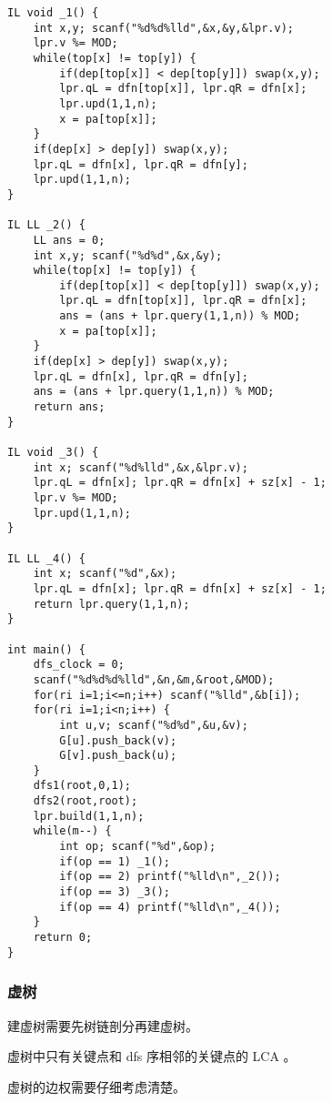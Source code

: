 \documentclass[UTF8]{ctexart}
\begin{document}
\begin{framed}
\begin{lstlisting}
IL void _1() {
    int x,y; scanf("%d%d%lld",&x,&y,&lpr.v);
    lpr.v %= MOD;
    while(top[x] != top[y]) {
        if(dep[top[x]] < dep[top[y]]) swap(x,y);
        lpr.qL = dfn[top[x]], lpr.qR = dfn[x];
        lpr.upd(1,1,n);
        x = pa[top[x]];
    }
    if(dep[x] > dep[y]) swap(x,y);
    lpr.qL = dfn[x], lpr.qR = dfn[y];
    lpr.upd(1,1,n);
}

IL LL _2() {
    LL ans = 0;
    int x,y; scanf("%d%d",&x,&y);
    while(top[x] != top[y]) {
        if(dep[top[x]] < dep[top[y]]) swap(x,y);
        lpr.qL = dfn[top[x]], lpr.qR = dfn[x];
        ans = (ans + lpr.query(1,1,n)) % MOD;
        x = pa[top[x]];
    }
    if(dep[x] > dep[y]) swap(x,y);
    lpr.qL = dfn[x], lpr.qR = dfn[y];
    ans = (ans + lpr.query(1,1,n)) % MOD;
    return ans;
}

IL void _3() {
    int x; scanf("%d%lld",&x,&lpr.v);
    lpr.qL = dfn[x]; lpr.qR = dfn[x] + sz[x] - 1;
    lpr.v %= MOD;
    lpr.upd(1,1,n);
}

IL LL _4() {
    int x; scanf("%d",&x);
    lpr.qL = dfn[x]; lpr.qR = dfn[x] + sz[x] - 1;
    return lpr.query(1,1,n);
}

int main() {
    dfs_clock = 0;
    scanf("%d%d%d%lld",&n,&m,&root,&MOD);
    for(ri i=1;i<=n;i++) scanf("%lld",&b[i]);
    for(ri i=1;i<n;i++) {
        int u,v; scanf("%d%d",&u,&v);
        G[u].push_back(v);
        G[v].push_back(u);
    }
    dfs1(root,0,1);
    dfs2(root,root);
    lpr.build(1,1,n);
    while(m--) {
        int op; scanf("%d",&op);
        if(op == 1) _1();
        if(op == 2) printf("%lld\n",_2());
        if(op == 3) _3();
        if(op == 4) printf("%lld\n",_4());
    }
    return 0;
}
\end{lstlisting}
\end{framed}

\subsubsection{虚树}
建虚树需要先树链剖分再建虚树。

虚树中只有关键点和 dfs 序相邻的关键点的 LCA 。

虚树的边权需要仔细考虑清楚。
\end{document}
